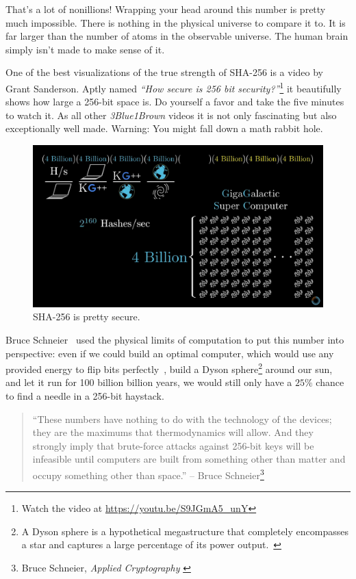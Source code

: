That's a lot of nonillions! Wrapping your head around this number is
pretty much impossible. There is nothing in the physical universe to
compare it to. It is far larger than the number of atoms in the
observable universe. The human brain simply isn't made to make sense of
it.

One of the best visualizations of the true strength of SHA-256 is a video by
Grant Sanderson. Aptly named \textit{\enquote{How secure is 256 bit
security?}}\footnote{Watch the video at \url{https://youtu.be/S9JGmA5_unY}} it
beautifully shows how large a 256-bit space is. Do yourself a favor and take the
five minutes to watch it. As all other \textit{3Blue1Brown} videos it is not
only fascinating but also exceptionally well made. Warning: You might fall down
a math rabbit hole.

\begin{figure}
  \includegraphics{assets/images/youtube-vid.png}
  \caption{SHA-256 is pretty secure.}
  \label{fig:youtube-vid}
\end{figure}

Bruce Schneier~\cite{web:schneier} used the physical limits of computation to put this
number into perspective: even if we could build an optimal computer,
which would use any provided energy to flip bits perfectly~\cite{wiki:landauer}, build a
Dyson sphere\footnote{A Dyson sphere is a hypothetical megastructure that completely encompasses a star and captures a large percentage of its power output.~\cite{wiki:dyson}} around our sun, and let it run for 100 billion billion
years, we would still only have a $25\%$ chance to find a needle in a
256-bit haystack.

\begin{samepage}\begin{quotation}
``These numbers have nothing to do with the technology of the devices;
they are the maximums that thermodynamics will allow. And they
strongly imply that brute-force attacks against 256-bit keys will be
infeasible until computers are built from something other than matter
and occupy something other than space.''
\flushright -- Bruce Schneier\footnote{Bruce Schneier, \textit{Applied Cryptography} \cite{bruce-schneier}}
\end{quotation}\end{samepage}

